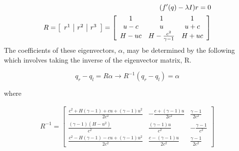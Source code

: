 \documentclass{article}%
\numberwithin{equation}{section}
\begin{document}
\begin{equation}
\begin{split}
(f'(q) - \lambda I) r = 0 \\
R = \left[ \begin{array}{c |c | c} r^1 & r^2 & r^3 \end{array} \right]= \left[ \begin{array}{ccc} 1 & 1 & 1 \\ u- c & u  & u + c \\ H - u c &  H - \frac{c^2}{\gamma - 1} & H + u c   \end{array} \right] 
\end{split}
\end{equation}The coefficients of these eigenvectors, $\alpha$, may be determined by the following which involves taking the inverse of the eigenvector matrix, R.

\begin{equation}
q_r - q_l = R \alpha \rightarrow R^{-1} (q_r - q_l) = \alpha \label{alphaeqn}
\end{equation}

where 

\begin{equation}
\begin{split}
R^{-1} = \left[ \begin{array}{ccc} \frac{c^2 + H (\gamma-1) + c u + (\gamma-1) u^2}{2 c^2} & -\frac{c + (\gamma - 1) u}{2 c^2} & \frac{\gamma - 1}{2 c^2} \\ \frac{ (\gamma - 1) (H - u^2)}{c^2} & \frac{(\gamma - 1) u}{c^2} & - \frac{\gamma - 1}{c^2} \\   \frac{c^2 - H (\gamma - 1) - c u + (\gamma - 1) u^2}{2 c^2} & \frac{c - (\gamma - 1) u}{2 c^2} & \frac{\gamma - 1}{2 c^2} \end{array} \right] \\ 
\end{split}
\end{equation}
\end{document}
